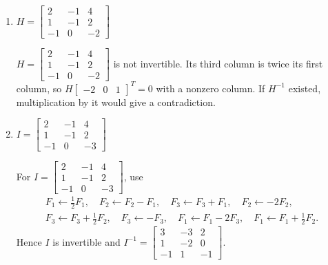 \begin{enumerate}[label=\alph*)]
\begin{answer}
For $G=\begin{bmatrix}0&3&1\\-1&3&1\\0&1&1\end{bmatrix}$, use
\[
\begin{gathered}
 F_1\leftrightarrow F_2,\quad F_1\gets-F_1,\quad
 F_2\leftrightarrow F_3,\quad F_3\gets F_3-3F_2,\quad F_3\gets-\tfrac12F_3,\\
 F_2\gets F_2-F_3,\quad F_1\gets F_1+F_3,\quad F_1\gets F_1+3F_2.
\end{gathered}
\]
The left block becomes $I_3$, and
\[
 G^{-1}=\begin{bmatrix}1&-1&0\\1/2&0&-1/2\\-1/2&0&3/2\end{bmatrix}.
\]
\end{answer}

\item $H=\begin{bmatrix}2&-1&4\\1&-1&2\\-1&0&-2\end{bmatrix}$

\begin{answer}
$H=\begin{bmatrix}2&-1&4\\1&-1&2\\-1&0&-2\end{bmatrix}$ is not invertible.
Its third column is twice its first column, so
$H\begin{bmatrix}-2&0&1\end{bmatrix}^T=0$ with a nonzero column.
If $H^{-1}$ existed, multiplication by it would give a contradiction.
\end{answer}

\item $I=\begin{bmatrix}2&-1&4\\1&-1&2\\-1&0&-3\end{bmatrix}$

\begin{answer}
For $I=\begin{bmatrix}2&-1&4\\1&-1&2\\-1&0&-3\end{bmatrix}$, use
\[
\begin{gathered}
 F_1\gets\tfrac12F_1,\quad F_2\gets F_2-F_1,\quad
 F_3\gets F_3+F_1,\quad F_2\gets-2F_2,\\
 F_3\gets F_3+\tfrac12F_2,\quad F_3\gets-F_3,\quad
 F_1\gets F_1-2F_3,\quad F_1\gets F_1+\tfrac12F_2.
\end{gathered}
\]
Hence $I$ is invertible and
$I^{-1}=\begin{bmatrix}3&-3&2\\1&-2&0\\-1&1&-1\end{bmatrix}$.
\end{answer}


\end{enumerate}
